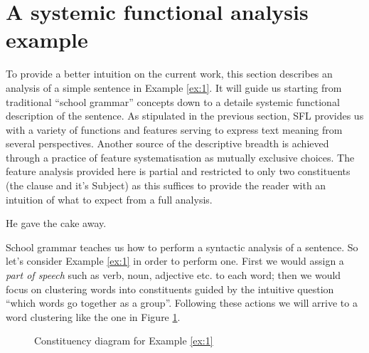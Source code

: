 \section{A systemic functional analysis example}
\label{sec:example}
To provide a better intuition on the current work, this section describes an analysis of a simple sentence in Example \ref{ex:1}. It will guide us starting from traditional ``school grammar'' concepts down to a detaile systemic functional description of the sentence. %
As stipulated in the previous section, SFL provides us with a variety of functions and features serving to express text meaning from several perspectives. Another source of the descriptive breadth is achieved through a practice of feature systematisation as mutually exclusive choices. %
The feature analysis provided here is partial and restricted to only two constituents (the clause and it's Subject) as this suffices to provide the reader with an intuition of what to expect from a full analysis.

\begin{exe}
    \ex\label{ex:1} He gave the cake away.
\end{exe}

School grammar teaches us how to perform a syntactic analysis of a sentence. So let's consider Example \ref{ex:1} in order to perform one. First we would assign a \textit{part of speech} such as verb, noun, adjective etc. to each word; then we would focus on clustering words into constituents guided by the intuitive question ``which words go together as a group''. Following these actions we will arrive to a word clustering like the one in Figure \ref{fig:mcg-graph-example-simple-structure}.

\begin{figure}[!ht]
    \centering
    \caption{Constituency diagram for Example \ref{ex:1}}
    \label{fig:mcg-graph-example-simple-structure}
\end{figure}


